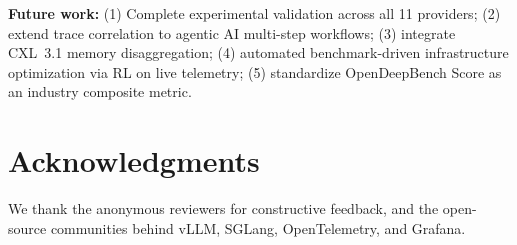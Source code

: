 \documentclass[conference,10pt]{IEEEtran}
\begin{document}
\textbf{Future work:} (1) Complete experimental validation across all 11 providers; (2) extend trace correlation to agentic AI multi-step workflows; (3) integrate CXL~3.1 memory disaggregation; (4) automated benchmark-driven infrastructure optimization via RL on live telemetry; (5) standardize OpenDeepBench Score as an industry composite metric.

\section*{Acknowledgments}
We thank the anonymous reviewers for constructive feedback, and the open-source communities behind vLLM, SGLang, OpenTelemetry, and Grafana.

\balance


\end{document}
